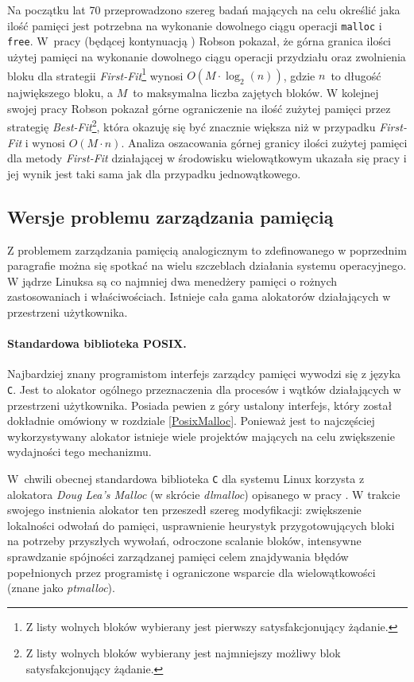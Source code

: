 \documentclass[12pt,a4paper,titlepage,twoside]{mwart}
\begin{document}
Na początku lat 70 przeprowadzono szereg badań mających na celu określić jaka
ilość pamięci jest potrzebna na wykonanie dowolnego ciągu operacji
\texttt{malloc} i \texttt{free}. W~pracy \cite{robson74bounds} (będącej
kontynuacją \cite{robson71estimate}) Robson pokazał, że górna granica ilości
użytej pamięci na wykonanie dowolnego ciągu operacji przydziału oraz zwolnienia
bloku dla strategii \textit{First-Fit}\footnote{Z listy wolnych bloków
wybierany jest pierwszy satysfakcjonujący żądanie.} wynosi $O(M \cdot
\log_{2}(n))$, gdzie $n$~to długość największego bloku, a $M$~to maksymalna
liczba zajętych bloków. W kolejnej swojej pracy \cite{robson77worst} Robson
pokazał górne ograniczenie na ilość zużytej pamięci przez strategię
\textit{Best-Fit}\footnote{Z listy wolnych bloków wybierany jest najmniejszy
możliwy blok satysfakcjonujący żądanie.}, która okazuję się być znacznie
większa niż w przypadku \textit{First-Fit} i wynosi $O(M \cdot n)$. Analiza
oszacowania górnej granicy ilości zużytej pamięci dla metody \textit{First-Fit}
działającej w środowisku wielowątkowym ukazała się pracy \cite{luby94tight} i
jej wynik jest taki sama jak dla przypadku jednowątkowego.

\subsection{Wersje problemu zarządzania pamięcią}

Z problemem zarządzania pamięcią analogicznym to zdefinowanego w poprzednim
paragrafie można się spotkać na wielu szczeblach działania systemu
operacyjnego. W jądrze Linuksa są co najmniej dwa menedżery pamięci o rożnych
zastosowaniach i właściwościach. Istnieje cała gama alokatorów działających w
przestrzeni użytkownika.

\paragraph{Standardowa biblioteka POSIX.}

Najbardziej znany programistom interfejs zarządcy pamięci wywodzi się z języka
\verb+C+. Jest to alokator ogólnego przeznaczenia dla procesów i wątków
działających w przestrzeni użytkownika. Posiada pewien z góry ustalony
interfejs, który został dokładnie omówiony w rozdziale \ref{PosixMalloc}.
Ponieważ jest to najczęściej wykorzystywany alokator istnieje wiele projektów
mających na celu zwiększenie wydajności tego mechanizmu.

W~chwili obecnej standardowa biblioteka \verb+C+ dla systemu Linux korzysta z
alokatora \textit{Doug Lea's Malloc} (w skrócie \textit{dlmalloc}) opisanego w
pracy \cite{douglea96malloc}. W trakcie swojego instnienia alokator ten
przeszedł szereg modyfikacji: zwiększenie lokalności odwołań do pamięci,
usprawnienie heurystyk przygotowujących bloki na potrzeby przyszłych wywołań,
odroczone scalanie bloków, intensywne sprawdzanie spójności zarządzanej pamięci
celem znajdywania błędów popełnionych przez programistę i ograniczone wsparcie
dla wielowątkowości (znane jako \textit{ptmalloc}).
\end{document}
